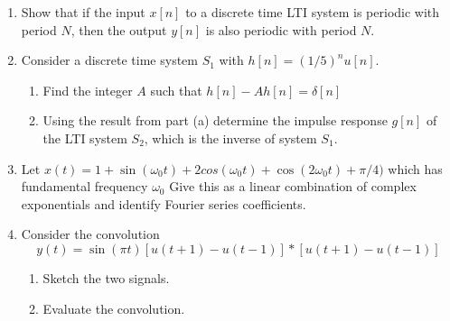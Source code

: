 \documentclass[12pt]{article}
\begin{document}
\begin{enumerate}
\item Show that if the input $x[n]$ to a discrete time LTI system is periodic with period $N$, then the output $y[n]$ is also periodic with period $N$.

\item Consider a discrete time system $S_1$ with $h[n] = (1/5)^{n}u[n]$.

\begin{enumerate}
    \item Find the integer $A$ such that $ h[n] - Ah[n] = \delta[n] $
    \item Using the result from part (a) determine the impulse response $g[n]$ of the LTI system $S_2$, which is the inverse of system $S_1$.
\end{enumerate}

\item Let $x(t) = 1 + \sin(\omega_0t) + 2cos(\omega_0t) + \cos(2\omega_0t)+\pi/4)$ which has fundamental frequency $\omega_0$ Give this as a linear combination of complex exponentials and identify Fourier series coefficients.

\item Consider the convolution
        \begin{equation*}
            y(t) = \sin(\pi t) \left[u(t+1) - u(t-1)\right] \ast \left[u(t+1) - u(t-1)\right]
        \end{equation*}
        \begin{enumerate}
            \item Sketch the two signals.
            \item Evaluate the convolution.
        \end{enumerate}


\end{enumerate}

\end{document}
